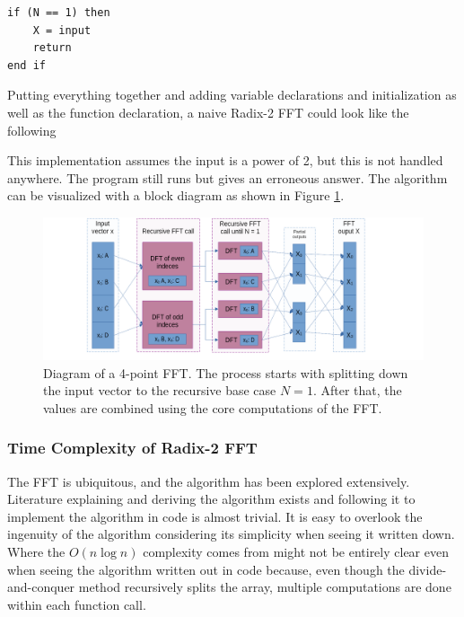 \begin{lstlisting}    
if (N == 1) then
    X = input
    return
end if
\end{lstlisting}

Putting everything together and adding variable declarations and initialization as well as the function declaration, a naive Radix-2 FFT could look like the following



This implementation assumes the input is a power of 2, but this is not handled anywhere. The program still runs but gives an erroneous answer. The algorithm can be visualized with a block diagram as shown in Figure \ref{fig:FFT-Alg}.

\begin{figure}[ht]
    \centering
    \includegraphics[width=\textwidth]{./images/fft.png}
    \caption{Diagram of a 4-point FFT. The process starts with splitting down the input vector to the recursive base case $N=1$. After that, the values are combined using the core computations of the FFT.\label{fig:FFT-Alg}}
\end{figure}

\subsubsection{Time Complexity of Radix-2 FFT}
The FFT is ubiquitous, and the algorithm has been explored extensively. Literature explaining and deriving the algorithm exists and following it to implement the algorithm in code is almost trivial. It is easy to overlook the ingenuity of the algorithm considering its simplicity when seeing it written down. Where the $O(n\log n)$ complexity comes from might not be entirely clear even when seeing the algorithm written out in code because, even though the divide-and-conquer method recursively splits the array, multiple computations are done within each function call. 

